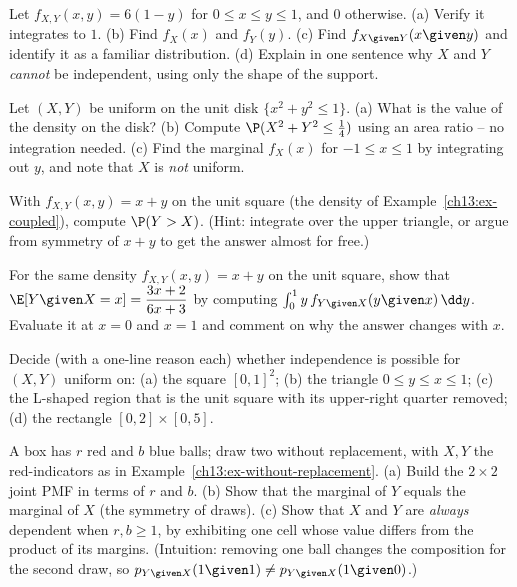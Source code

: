 \begin{exercise}
\label{ch13:ex-coupled-ex}
Let $f_{X,Y}(x,y) = 6(1-y)$ for $0\le x\le y\le 1$, and $0$ otherwise.
(a) Verify it integrates to $1$. (b) Find $f_X(x)$ and $f_Y(y)$. (c) Find
$f_{X\given Y}(x\given y)$ and identify it as a familiar distribution.
(d) Explain in one sentence why $X$ and $Y$ \emph{cannot} be independent, using
only the shape of the support.
\end{exercise}

\begin{exercise}
\label{ch13:ex-disk}
Let $(X,Y)$ be uniform on the unit disk $\{x^2+y^2\le 1\}$.
(a) What is the value of the density on the disk? (b) Compute
$\P(X^2+Y^2 \le \tfrac14)$ using an area ratio -- no integration needed.
(c) Find the marginal $f_X(x)$ for $-1\le x\le 1$ by integrating out $y$, and
note that $X$ is \emph{not} uniform.
\end{exercise}

\begin{exercise}
\label{ch13:ex-region}
With $f_{X,Y}(x,y) = x+y$ on the unit square (the density of
Example~\ref{ch13:ex-coupled}), compute $\P(Y > X)$. (Hint: integrate over the
upper triangle, or argue from symmetry of $x+y$ to get the answer almost for
free.)
\end{exercise}

\begin{exercise}
\label{ch13:ex-cond-vary}
For the same density $f_{X,Y}(x,y)=x+y$ on the unit square, show that
$\E[Y\given X=x] = \dfrac{3x+2}{6x+3}$ by computing
$\int_0^1 y\,f_{Y\given X}(y\given x)\,\dd y$. Evaluate it at $x=0$ and $x=1$ and
comment on why the answer changes with $x$.
\end{exercise}

\begin{exercise}
\label{ch13:ex-support}
Decide (with a one-line reason each) whether independence is possible for $(X,Y)$
uniform on: (a) the square $[0,1]^2$; (b) the triangle $0\le y\le x\le 1$;
(c) the L-shaped region that is the unit square with its upper-right quarter
removed; (d) the rectangle $[0,2]\times[0,5]$.
\end{exercise}

\begin{exercise}
\label{ch13:ex-without-gen}
A box has $r$ red and $b$ blue balls; draw two without replacement, with $X,Y$
the red-indicators as in Example~\ref{ch13:ex-without-replacement}. (a) Build the
$2\times 2$ joint PMF in terms of $r$ and $b$. (b) Show that the marginal of $Y$
equals the marginal of $X$ (the symmetry of draws). (c) Show that $X$ and $Y$ are
\emph{always} dependent when $r,b\ge 1$, by exhibiting one cell whose value
differs from the product of its margins. (Intuition: removing one ball changes
the composition for the second draw, so $p_{Y\given X}(1\given 1)\ne
p_{Y\given X}(1\given 0)$.)
\end{exercise}

